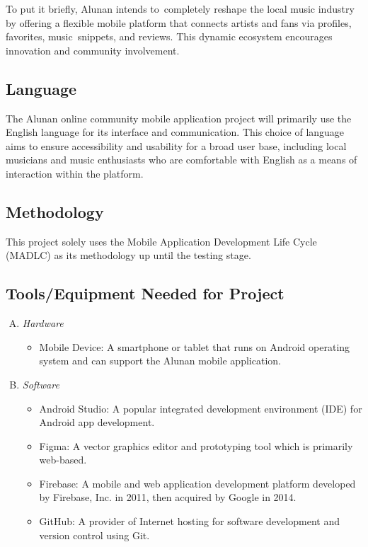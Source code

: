 To put it briefly, Alunan intends to completely reshape the local music industry by offering a flexible mobile platform that connects artists and fans via profiles, favorites, music snippets, and reviews. This dynamic ecosystem encourages innovation and community involvement.

\subsection{Language}
The Alunan online community mobile application project will primarily use the English language for its interface and communication. This choice of language aims to ensure accessibility and usability for a broad user base, including local musicians and music enthusiasts who are comfortable with English as a means of interaction within the platform.

\subsection{Methodology}
This project solely uses the Mobile Application Development Life Cycle (MADLC) as its methodology up until the testing stage.

\subsection{Tools/Equipment Needed for Project}
\begin{enumerate}[A.]
    \item \textit{Hardware}
    \begin{itemize}
        \item Mobile Device: A smartphone or tablet that runs on Android operating system and can support the Alunan mobile application.
    \end{itemize}
    \item \textit{Software}
    \begin{itemize}
        \item Android Studio: A popular integrated development environment (IDE) for Android app development.
        \item Figma: A vector graphics editor and prototyping tool which is primarily web-based.
        \item Firebase: A mobile and web application development platform developed by Firebase, Inc. in 2011, then acquired by Google in 2014.
        \item GitHub: A provider of Internet hosting for software development and version control using Git.
    \end{itemize}
\end{enumerate}

